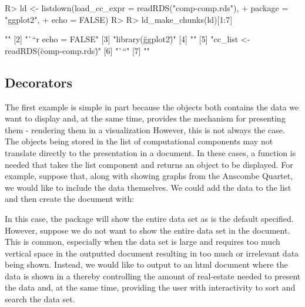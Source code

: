 \documentclass[
]{jss}
\begin{document}
\begin{CodeChunk}
\begin{CodeInput}
R> ld <- listdown(load_cc_expr = readRDS("comp-comp.rds"), 
+                package = "ggplot2",
+                echo = FALSE)
R> 
R> ld_make_chunks(ld)[1:7]
\end{CodeInput}
\begin{CodeOutput}
[1] ""                                     
[2] "```{r echo = FALSE}"                  
[3] "library(\"ggplot2\")"                     
[4] ""                                     
[5] "cc_list <- readRDS(\"comp-comp.rds\")"
[6] "```"                                  
[7] ""                                     
\end{CodeOutput}
\end{CodeChunk}

\hypertarget{decorators}{%
\subsection{Decorators}\label{decorators}}

The first example is simple in part because the  objects
both contains the data we want to display and, at the same time,
provides the mechanism for presenting them - rendering them in a
visualization However, this is not always the case. The objects being
stored in the list of computational components may not translate
directly to the presentation in a document. In these cases, a function
is needed that takes the list component and returns an object to be
displayed. For example, suppose that, along with showing graphs from the
Anscombe Quartet, we would like to include the data themselves. We could
add the data to the  list and then create
the document with:

\begin{CodeChunk}
\end{CodeChunk}

In this case, the  package will show the entire data set
as is the default specified. However, suppose we do not want to show the
entire data set in the document. This is common, especially when the
data set is large and requires too much vertical space in the outputted
document resulting in too much or irrelevant data being shown. Instead,
we would like to output to an html document where the data is shown in a
 thereby controlling the amount of real-estate needed to
present the data and, at the same time, providing the user with
interactivity to sort and search the data set.
\end{document}

